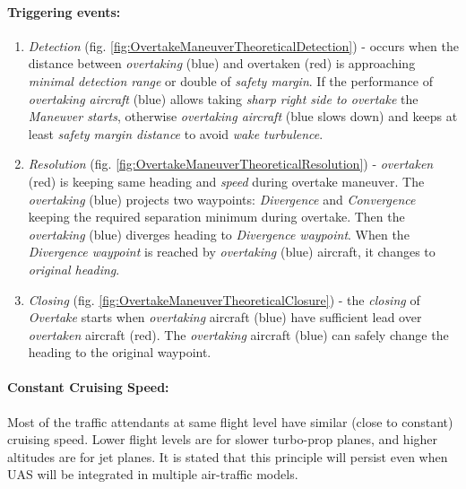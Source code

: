 \paragraph{Triggering events:}
\begin{enumerate}
    \item \emph{Detection} (fig. \ref{fig:OvertakeManeuverTheoreticalDetection}) - occurs when the distance between \emph{overtaking} (blue) and overtaken (red) is approaching \emph{minimal detection range} or double of \emph{safety margin}. If the performance of \emph{overtaking aircraft} (blue) allows taking \emph{sharp right side to overtake} the \emph{Maneuver starts}, otherwise \emph{overtaking aircraft} (blue slows down) and keeps at least \emph{safety margin distance} to avoid \emph{wake turbulence}.
    
    \item \emph{Resolution} (fig. \ref{fig:OvertakeManeuverTheoreticalResolution}) - \emph{overtaken} (red) is keeping same heading and \emph{speed} during overtake maneuver. The \emph{overtaking} (blue) projects two waypoints: \emph{Divergence} and \emph{Convergence} keeping the required separation minimum during overtake. Then the \emph{overtaking} (blue) diverges heading to \emph{Divergence waypoint}. When the \emph{Divergence waypoint} is reached by \emph{overtaking} (blue) aircraft, it changes to \emph{original heading}.
    
    \item \emph{Closing} (fig. \ref{fig:OvertakeManeuverTheoreticalClosure}) - the \emph{closing} of \emph{Overtake} starts when \emph{overtaking} aircraft (blue) have sufficient lead over \emph{overtaken} aircraft (red). The \emph{overtaking} aircraft (blue) can safely change the heading to the original waypoint.
\end{enumerate}


\paragraph{Constant Cruising Speed:} Most of the traffic attendants at same flight level have similar (close to constant) cruising speed. Lower flight levels are for slower turbo-prop planes, and higher altitudes are for jet planes. It is stated that this principle will persist even when UAS will be integrated \cite{bayen2005langrangian,kopardekar2002dynamic,helme1992optimization} in multiple air-traffic models.


